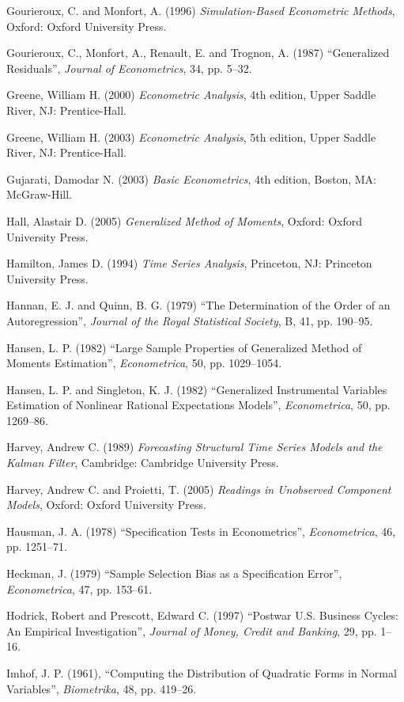 \begin{thebibliography}
  Gourieroux, C. and Monfort, A. (1996) \emph{Simulation-Based
    Econometric Methods}, Oxford: Oxford University Press.

  Gourieroux, C., Monfort, A., Renault, E. and Trognon, A. (1987)
  ``Generalized Residuals'', \emph{Journal of Econometrics}, 34,
  pp. 5--32.  

  Greene, William H. (2000) \emph{Econometric Analysis}, 4th edition,
  Upper Saddle River, NJ: Prentice-Hall.

  Greene, William H. (2003) \emph{Econometric Analysis}, 5th edition,
  Upper Saddle River, NJ: Prentice-Hall.

  Gujarati, Damodar N. (2003) \emph{Basic Econometrics}, 4th edition,
  Boston, MA: McGraw-Hill.

  Hall, Alastair D. (2005) \emph{Generalized Method of Moments},
  Oxford: Oxford University Press.

  Hamilton, James D. (1994) \emph{Time Series Analysis}, Princeton,
  NJ: Princeton University Press.

  Hannan, E. J. and Quinn, B. G. (1979) ``The Determination of the
    Order of an Autoregression'', \emph{Journal of the Royal
    Statistical Society}, B, 41, pp. 190--95.

  Hansen, L. P. (1982) ``Large Sample Properties of Generalized Method
  of Moments Estimation'', \emph{Econometrica}, 50, pp. 1029--1054.

  Hansen, L. P. and Singleton, K. J. (1982) ``Generalized
  Instrumental Variables Estimation of Nonlinear Rational Expectations
  Models'', \emph{Econometrica}, 50, pp. 1269--86. 

  Harvey, Andrew C. (1989) \emph{Forecasting Structural Time Series
    Models and the Kalman Filter}, Cambridge: Cambridge University
  Press.

  Harvey, Andrew C. and Proietti, T. (2005) \emph{Readings in
    Unobserved Component Models}, Oxford: Oxford University Press.

  Hausman, J. A. (1978) ``Specification Tests in Econometrics'',
  \emph{Econometrica}, 46, pp. 1251--71.

  Heckman, J. (1979) ``Sample Selection Bias as a Specification Error'',
  \emph{Econometrica}, 47, pp. 153--61.

  Hodrick, Robert and Prescott, Edward C. (1997) ``Postwar U.S. Business
  Cycles: An Empirical Investigation'', \emph{Journal of Money, Credit and
  Banking}, 29, pp. 1--16.

  Imhof, J. P. (1961), ``Computing the Distribution of Quadratic Forms
  in Normal Variables'', \emph{Biometrika}, 48, pp. 419--26.


\end{thebibliography}
